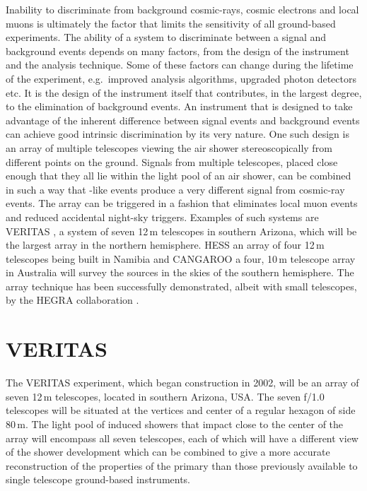 Inability to discriminate \Grays from background cosmic-rays, cosmic
electrons and local muons is ultimately the factor that limits the
sensitivity of all ground-based experiments. The ability of a system
to discriminate between a \Gray signal and background events depends
on many factors, from the design of the instrument and the analysis
technique. Some of these factors can change during the lifetime of the
experiment, e.g.\ improved analysis algorithms, upgraded photon
detectors etc. It is the design of the instrument itself that
contributes, in the largest degree, to the elimination of background
events. An instrument that is designed to take advantage of the
inherent difference between signal events and background events can
achieve good intrinsic discrimination by its very nature. One such
design is an array of multiple telescopes viewing the air shower
stereoscopically from different points on the ground. Signals from
multiple telescopes, placed close enough that they all lie within the
\Cerenkov light pool of an air shower, can be combined in such a way
that \Grayc-like events produce a very different signal from
cosmic-ray events. The array can be triggered in a fashion that
eliminates local muon events and reduced accidental night-sky
triggers. Examples of such systems are VERITAS
\citep{REF::WEEKES::AP2002}, a system of seven 12\,m telescopes
in southern Arizona, which will be the largest array in the northern
hemisphere. HESS \citep{REF::HESS::2002BOOKLET} an array of four 12\,m
telescopes being built in Namibia and CANGAROO
\citep{REF::ENOMOTO::APP} a four, 10\,m telescope array in Australia will
survey the sources in the skies of the southern hemisphere. The array
technique has been successfully demonstrated, albeit with small
telescopes, by the HEGRA collaboration \citep{REF::KONOPELKO::1999AP}.

\section{VERITAS}
\label{SEC::VERITAS::INSTRUMENT}

The VERITAS experiment, which began construction in 2002, will be an
array of seven 12\,m telescopes, located in southern Arizona, USA. The
seven f/1.0 telescopes will be situated at the vertices and center of
a regular hexagon of side 80\,m. The \Cerenkov light pool of \Gray
induced showers that impact close to the center of the array will
encompass all seven telescopes, each of which will have a different
view of the shower development which can be combined to give a more
accurate reconstruction of the properties of the primary than those
previously available to single telescope ground-based \Gray
instruments.

